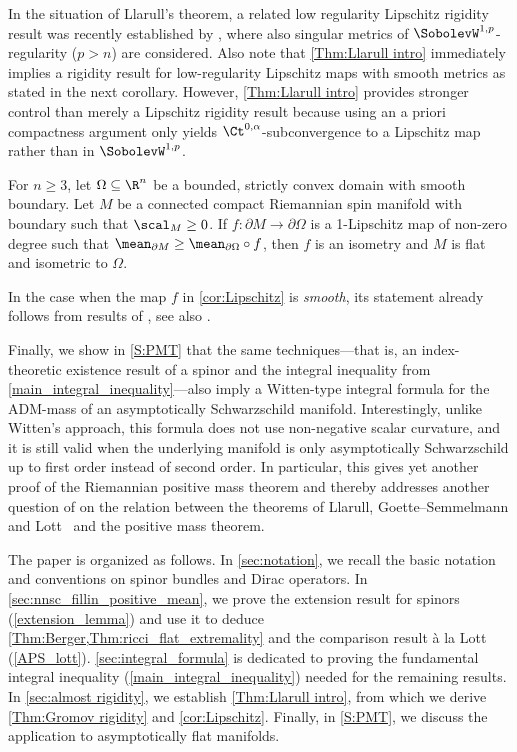 \documentclass[a4paper,11pt]{amsart}
\numberwithin{equation}{section}
\begin{document}
In the situation of Llarull's theorem, a related low regularity Lipschitz rigidity result was recently established by \textcite{cecchini2023lipschitz}, where also singular metrics of $\SobolevW^{1,p}$-regularity ($p>n$) are considered.
Also note that \cref{Thm:Llarull intro} immediately implies a rigidity result for low-regularity Lipschitz maps with smooth metrics as stated in the next corollary.
However, \cref{Thm:Llarull intro} provides stronger control than merely a Lipschitz rigidity result because using an a priori compactness argument only yields \(\Ct^{0,\alpha}\)-subconvergence to a Lipschitz map rather than in \(\SobolevW^{1,p}\).
\begin{corollary}\label{cor:Lipschitz}
    For $n\geq3$, let \(\Omega \subseteq \R^n\) be a bounded, strictly convex domain with smooth boundary.
    Let \(M\) be a connected compact Riemannian spin manifold with boundary such that \(\scal_M \geq 0\). 
    If $f\colon\partial M\to\partial\Omega$ is a  1-Lipschitz map of non-zero degree such that \(\mean_{\partial M} \geq \mean_{\partial \Omega} \circ f\), then $f$ is an isometry and $M$ is flat and isometric to $\Omega$.
\end{corollary}
In the case when the map $f$ in  \cref{cor:Lipschitz} is \emph{smooth}, its statement already follows from results of \textcite[Theorem 3.2]{wang2023gromovs}, see also \cite[Theorem~1.1]{wang2022rigidity}.

Finally, we show in \cref{S:PMT} that the same techniques---that is, an index-theoretic existence result of a spinor and the integral inequality from \cref{main_integral_inequality}---also imply a Witten-type integral formula \cite{witten1981new} for the ADM-mass of an asymptotically Schwarzschild manifold.
Interestingly, unlike Witten's approach, this formula does not use non-negative scalar curvature, and it is still valid when the underlying manifold is only asymptotically Schwarzschild up to first order instead of second order.
In particular, this gives yet another proof of the Riemannian positive mass theorem and thereby addresses another question of \textcite[3]{gromov2019scalar} on the relation between the theorems of Llarull, Goette--Semmelmann and Lott~\cite{Llarull,GoetteSemmelmann,Lott} and the positive mass theorem.

The paper is organized as follows.
In \cref{sec:notation}, we recall the basic notation and conventions on spinor bundles and Dirac operators.
In \cref{sec:nnsc_fillin_positive_mean}, we prove the extension result for spinors (\cref{extension_lemma}) and use it to deduce \cref{Thm:Berger,Thm:ricci_flat_extremality} and the comparison result à la Lott (\cref{APS_lott}).
\cref{sec:integral_formula} is dedicated to proving the fundamental integral inequality (\cref{main_integral_inequality}) needed for the remaining results.
In \cref{sec:almost rigidity}, we establish \cref{Thm:Llarull intro}, from which we derive \cref{Thm:Gromov rigidity} and \cref{cor:Lipschitz}.
Finally, in \cref{S:PMT}, we discuss the application to asymptotically flat manifolds.
\end{document}
